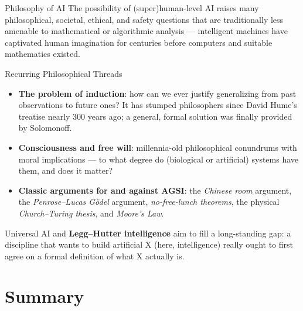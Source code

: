 \documentclass[aspectratio=169,10pt]{beamer}
\begin{document}
\begin{frame}{Philosophy of AI}
  The possibility of (super)human-level AI raises many philosophical,
  societal, ethical, and safety questions that are traditionally less
  amenable to mathematical or algorithmic analysis --- intelligent machines
  have captivated human imagination for centuries before computers and
  suitable mathematics existed.

  \begin{block}{Recurring Philosophical Threads}
    \begin{itemize}
      \item \textbf{The problem of induction}: how can we ever justify
        generalizing from past observations to future ones? It has stumped
        philosophers since David Hume's treatise nearly 300 years ago; a
        general, formal solution was finally provided by Solomonoff.
      \item \textbf{Consciousness and free will}: millennia-old philosophical
        conundrums with moral implications --- to what degree do (biological
        or artificial) systems have them, and does it matter?
      \item \textbf{Classic arguments for and against AGSI}: the
        \emph{Chinese room} argument, the \emph{Penrose--Lucas G\"odel}
        argument, \emph{no-free-lunch theorems}, the physical
        \emph{Church--Turing thesis}, and \emph{Moore's Law}.
    \end{itemize}
  \end{block}
  Universal AI and \textbf{Legg--Hutter intelligence} aim to fill a
  long-standing gap: a discipline that wants to build artificial X (here,
  intelligence) really ought to first agree on a formal definition of what X
  actually is.
\end{frame}

\section{Summary}
\end{document}
